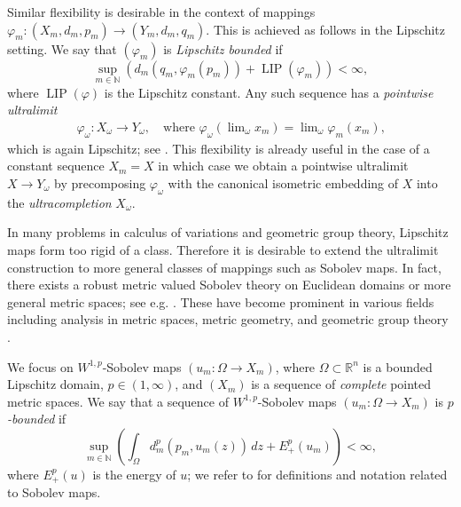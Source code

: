 \documentclass[a4paper,leqno]{amsart}
\numberwithin{equation}{section}
\theoremstyle{remark}
\theoremstyle{remark}
\newcommand{\N}{\mathbb{N}}
\DeclareMathOperator{\LIP}{LIP}
\begin{document}
Similar flexibility is desirable in the context of mappings $\varphi_m \colon ( X_m, d_m, p_m ) \to ( Y_m, d_m, q_m )$. This is achieved as follows in the Lipschitz setting. We say that $( \varphi_m )$ is \emph{Lipschitz bounded} if
\begin{equation}\label{equation-Lipschitz-boundedness}
    \sup_{ m \in \mathbb{N} } \left( d_m( q_m, \varphi_m(p_m) ) + \LIP( \varphi_m ) \right) < \infty,
\end{equation}
where $\LIP( \varphi )$ is the Lipschitz constant. Any such sequence has a \emph{pointwise ultralimit}
\begin{align*}
    \varphi_\omega \colon X_\omega \to Y_\omega,
    \quad\text{where $\varphi_\omega( \lim\nolimits_\omega x_m ) = \lim\nolimits_\omega \varphi_m(x_m)$,}
\end{align*}
which is again Lipschitz; see . This flexibility is already useful in the case of a constant sequence $X_m = X$ in which case we obtain a pointwise ultralimit $X \to Y_\omega$ by precomposing $\varphi_\omega$ with the canonical isometric embedding of $X$ into the \emph{ultracompletion} $X_\omega$.

In many problems in calculus of variations and geometric group theory, Lip\-schitz maps form too rigid of a class. Therefore it is desirable to extend the ultralimit construction to more general classes of mappings such as Sobolev maps. In fact, there exists a robust metric valued Sobolev theory on Euclidean domains or more general metric spaces; see e.g. \cite{Kor:Sch:93,Haj:96,Res:97,Hei:Kos:Sha:Ty:01,Hei:Kos:Sha:Ty:15}. These have become prominent in various fields including analysis in metric spaces, metric geometry, and geometric group theory \cite{gromov-schoen-1992-harmonic-maps-into-singular-spaces-and-p-adic-superrigidity-for-lattices-in-groups-of-rank-one,jost-1994-equilibrium-maps-between-metric-spaces,Schoen:Wolfson:01,daskalopoulos-mese-2011-superrigidity-of-hyperbolic-buildings,Lyt:Wen:17:areamini,Lyt:Wen:17:energyarea,Raj:17,Lyt:Wen:18:intrinsic,Lyt:Wen:18:CAT,Lyt:Wen:20,daskalopoulos-mese-2021-rigidity-of-teichmuller-space,Nta:Rom:22,ntalampekos-romney-2023-polyhedral-approximation-of-metric-surfaces-and-applications-to-uniformization,meier-wenger-2025-quasiconformal-almost-parametrizations-of-metric-surfaces}.

We focus on  $W^{1,p}$-Sobolev maps $( u_m \colon \Omega \to X_m )$, where $\Omega \subset \mathbb{R}^n$ is a bounded Lipschitz domain, $p \in (1,\infty)$, and $(X_m)$ is a sequence of \emph{complete} pointed metric spaces. We say that a sequence of $W^{1,p}$-Sobolev maps $( u_m \colon \Omega \to X_m )$ is \emph{$p$-bounded} if 
\begin{equation}\label{eq:bounded-Sobolev-sequence}
    \sup_{m\in\N} \left(\int_\Omega d^p_m(p_m, u_m(z))\,dz + E_+^p(u_m)\right)<\infty,
\end{equation}
where $E_{+}^p(u)$ is the energy of $u$; we refer to  for definitions and notation related to Sobolev maps.
\end{document}
